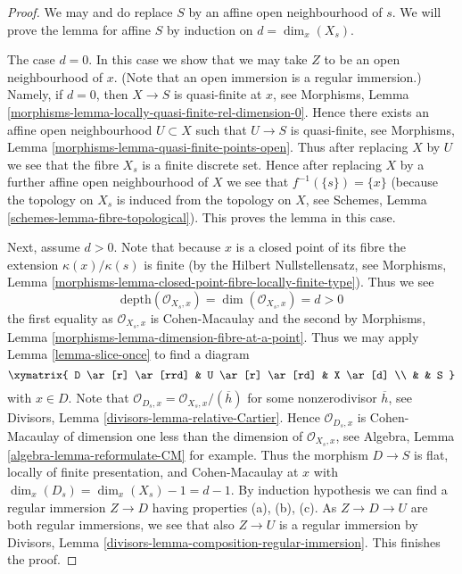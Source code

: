 \begin{proof}
We may and do replace $S$ by an affine open neighbourhood of $s$.
We will prove the lemma for affine $S$ by induction on $d = \dim_x(X_s)$.

\medskip\noindent
The case $d = 0$. In this case we show that we may take $Z$ to be
an open neighbourhood of $x$. (Note that an open immersion is
a regular immersion.) Namely, if $d = 0$, then $X \to S$
is quasi-finite at $x$, see
Morphisms, Lemma \ref{morphisms-lemma-locally-quasi-finite-rel-dimension-0}.
Hence there exists an affine open neighbourhood $U \subset X$ such
that $U \to S$ is quasi-finite, see
Morphisms, Lemma \ref{morphisms-lemma-quasi-finite-points-open}.
Thus after replacing $X$ by $U$ we see that the fibre $X_s$ is a finite
discrete set. Hence after replacing $X$ by a further affine open neighbourhood
of $X$ we see that $f^{-1}(\{s\}) = \{x\}$ (because the topology
on $X_s$ is induced from the topology on $X$, see
Schemes, Lemma \ref{schemes-lemma-fibre-topological}).
This proves the lemma in this case.

\medskip\noindent
Next, assume $d > 0$. Note that because $x$ is a closed point of its
fibre the extension $\kappa(x)/\kappa(s)$ is finite (by the
Hilbert Nullstellensatz, see
Morphisms, Lemma \ref{morphisms-lemma-closed-point-fibre-locally-finite-type}).
Thus we see
$$
\text{depth}(\mathcal{O}_{X_s, x}) = \dim(\mathcal{O}_{X_s, x}) = d > 0
$$
the first equality as $\mathcal{O}_{X_s, x}$ is Cohen-Macaulay and
the second by
Morphisms, Lemma \ref{morphisms-lemma-dimension-fibre-at-a-point}.
Thus we may apply
Lemma \ref{lemma-slice-once}
to find a diagram
$$
\xymatrix{
D \ar[r] \ar[rrd] & U \ar[r] \ar[rd] & X \ar[d] \\
& & S
}
$$
with $x \in D$. Note that
$\mathcal{O}_{D_s, x} = \mathcal{O}_{X_s, x}/(\overline{h})$ for some
nonzerodivisor $\overline{h}$, see
Divisors, Lemma \ref{divisors-lemma-relative-Cartier}.
Hence $\mathcal{O}_{D_s, x}$ is Cohen-Macaulay of dimension
one less than the dimension of $\mathcal{O}_{X_s, x}$, see
Algebra, Lemma \ref{algebra-lemma-reformulate-CM}
for example. Thus the morphism $D \to S$ is flat,
locally of finite presentation, and Cohen-Macaulay at $x$ with
$\dim_x(D_s) = \dim_x(X_s) - 1 = d - 1$. By induction hypothesis
we can find a regular immersion $Z \to D$ having properties (a), (b), (c).
As $Z \to D \to U$ are both regular immersions, we see that also
$Z \to U$ is a regular immersion by
Divisors, Lemma \ref{divisors-lemma-composition-regular-immersion}.
This finishes the proof.
\end{proof}

